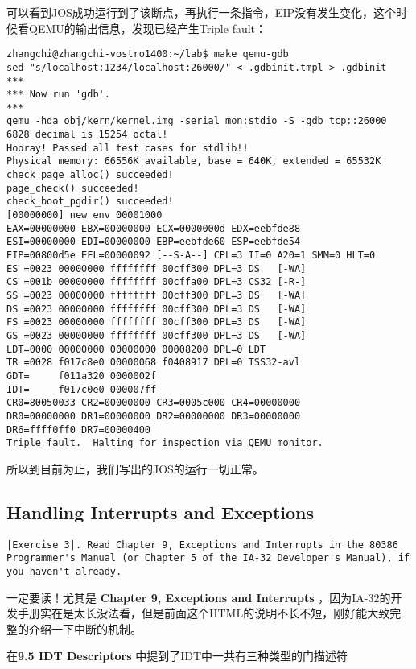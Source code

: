 \documentclass{article}
\begin{document}
\begin{CJK*}{UTF8}{gkai}
可以看到JOS成功运行到了该断点，再执行一条指令，EIP没有发生变化，这个时候看QEMU的输出信息，发现已经产生Triple fault：


\begin{lstlisting}[style=console]
zhangchi@zhangchi-vostro1400:~/lab$ make qemu-gdb
sed "s/localhost:1234/localhost:26000/" < .gdbinit.tmpl > .gdbinit
***
*** Now run 'gdb'.
***
qemu -hda obj/kern/kernel.img -serial mon:stdio -S -gdb tcp::26000
6828 decimal is 15254 octal!
Hooray! Passed all test cases for stdlib!!
Physical memory: 66556K available, base = 640K, extended = 65532K
check_page_alloc() succeeded!
page_check() succeeded!
check_boot_pgdir() succeeded!
[00000000] new env 00001000
EAX=00000000 EBX=00000000 ECX=0000000d EDX=eebfde88
ESI=00000000 EDI=00000000 EBP=eebfde60 ESP=eebfde54
EIP=00800d5e EFL=00000092 [--S-A--] CPL=3 II=0 A20=1 SMM=0 HLT=0
ES =0023 00000000 ffffffff 00cff300 DPL=3 DS   [-WA]
CS =001b 00000000 ffffffff 00cffa00 DPL=3 CS32 [-R-]
SS =0023 00000000 ffffffff 00cff300 DPL=3 DS   [-WA]
DS =0023 00000000 ffffffff 00cff300 DPL=3 DS   [-WA]
FS =0023 00000000 ffffffff 00cff300 DPL=3 DS   [-WA]
GS =0023 00000000 ffffffff 00cff300 DPL=3 DS   [-WA]
LDT=0000 00000000 00000000 00008200 DPL=0 LDT
TR =0028 f017c8e0 00000068 f0408917 DPL=0 TSS32-avl
GDT=     f011a320 0000002f
IDT=     f017c0e0 000007ff
CR0=80050033 CR2=00000000 CR3=0005c000 CR4=00000000
DR0=00000000 DR1=00000000 DR2=00000000 DR3=00000000 
DR6=ffff0ff0 DR7=00000400
Triple fault.  Halting for inspection via QEMU monitor.

\end{lstlisting}

所以到目前为止，我们写出的JOS的运行一切正常。


\subsection{Handling Interrupts and Exceptions}

\begin{lstlisting}[style=exercise]
|Exercise 3|. Read Chapter 9, Exceptions and Interrupts in the 80386 Programmer's Manual (or Chapter 5 of the IA-32 Developer's Manual), if you haven't already.
\end{lstlisting}

一定要读！尤其是 {\ttfamily \bfseries  Chapter 9, Exceptions and Interrupts } ，因为IA-32的开发手册实在是太长没法看，但是前面这个HTML的说明不长不短，刚好能大致完整的介绍一下中断的机制。

在{\ttfamily \bfseries 9.5 IDT Descriptors} 中提到了IDT中一共有三种类型的门描述符


\end{CJK*}
\end{document}
